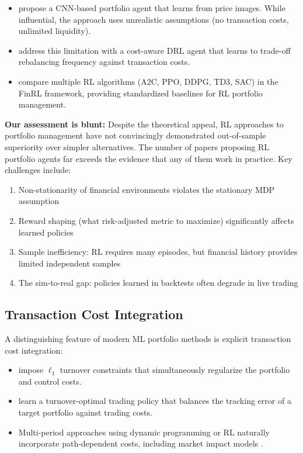 \begin{itemize}[leftmargin=*]
    \item \citet{Jiang2017} propose a CNN-based portfolio agent that learns from price images. While influential, the approach uses unrealistic assumptions (no transaction costs, unlimited liquidity).
    \item \citet{Ye2020} address this limitation with a cost-aware DRL agent that learns to trade-off rebalancing frequency against transaction costs.
    \item \citet{Wang2021} compare multiple RL algorithms (A2C, PPO, DDPG, TD3, SAC) in the FinRL framework, providing standardized baselines for RL portfolio management.
\end{itemize}

\textbf{Our assessment is blunt:} Despite the theoretical appeal, RL approaches to portfolio management have not convincingly demonstrated out-of-sample superiority over simpler alternatives. The number of papers proposing RL portfolio agents far exceeds the evidence that any of them work in practice. Key challenges include:
\begin{enumerate}[leftmargin=*]
    \item Non-stationarity of financial environments violates the stationary MDP assumption
    \item Reward shaping (what risk-adjusted metric to maximize) significantly affects learned policies
    \item Sample inefficiency: RL requires many episodes, but financial history provides limited independent samples
    \item The sim-to-real gap: policies learned in backtests often degrade in live trading
\end{enumerate}

\subsection{Transaction Cost Integration}

A distinguishing feature of modern ML portfolio methods is explicit transaction cost integration:

\begin{itemize}[leftmargin=*]
    \item \citet{DeMiguel2020} impose $\ell_1$ turnover constraints that simultaneously regularize the portfolio and control costs.
    \item \citet{Moallemi2023} learn a turnover-optimal trading policy that balances the tracking error of a target portfolio against trading costs.
    \item Multi-period approaches using dynamic programming or RL naturally incorporate path-dependent costs, including market impact models \citep{Almgren2001}.
\end{itemize}
